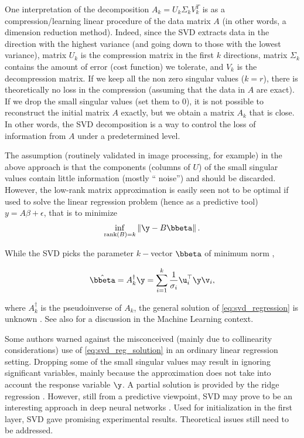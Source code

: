 One interpretation of the decomposition $A_{k}=U_{k}\Sigma_{k}V_{k}^{T}$ is as
a compression/learning linear procedure of the data matrix $A$ (in other
words, a dimension reduction method). Indeed, since the SVD extracts data in
the direction with the highest variance (and going down to those with the
lowest variance), matrix $U_{k}$ is the compression matrix in the first $k$
directions, matrix $\Sigma_{k}$ contains the amount of error (cost function)
we tolerate, and $V_{k}$ is the decompression matrix. If we keep all the non
zero singular values ($k=r$), there is theoretically no loss in the
compression (assuming that the data in $A$ are exact). If we drop the small
singular values (set them to $0$), it is not possible to reconstruct the
initial matrix $A$ exactly, but we obtain a matrix $A_{k}$ that is close. In
other words, the SVD decomposition is a way to control the loss of information
from $A$ under a predetermined level.

The assumption (routinely validated in image processing, for example) in the
above approach is that the components (columns of $U$) of the small singular
values contain little information (mostly \textquotedblleft
noise\textquotedblright) and should be discarded. However, the low-rank matrix approximation is easily seen not to be optimal if used to solve the linear regression problem (hence as a predictive tool) $y=A\beta+\epsilon$, that is to minimize
\begin{equation}
    \inf_{\mathrm{rank}(B)=k}\left\Vert \y-B\bbeta\right\Vert . 
    \label{eq:svd_regression}
\end{equation}

While the SVD picks the parameter $k-$vector $\bbeta$ of minimum norm
\citep{elden2007matrix,lange2010numerical},

\begin{equation}
    \hat{\bbeta}=A_{k}^{\dag} \y=\sum_{i=1}^{k}\frac{1}{\sigma_{i}} \u_{i}^\top \y \v_{i},
    \label{eq:svd_reg_solution}
\end{equation}

where $A_{k}^{\dag}$ is the pseudoinverse of $A_{k}$, the general solution of
\eqref{eq:svd_regression} is unknown \citep{xiang2012optimal}. See also \cite{talwalkar2010matrix} for a discussion in the Machine Learning context.

Some authors \citep{jolliffe1982note,hadi1998some} warned against the misconceived (mainly due to collinearity considerations) use of \eqref{eq:svd_reg_solution} in an ordinary linear regression setting. Dropping some of the small singular values may result in ignoring significant variables, mainly because the approximation does not take into account the response variable $\y$. A partial solution is provided by the ridge regression \citep{hoerl1970ridge}. However, still from a predictive viewpoint, SVD may prove to be an interesting approach in deep neural networks \citep{bermeitinger2019singular}. Used for initialization in the first layer, SVD gave promising experimental results. Theoretical issues still need to be addressed.

\newpage